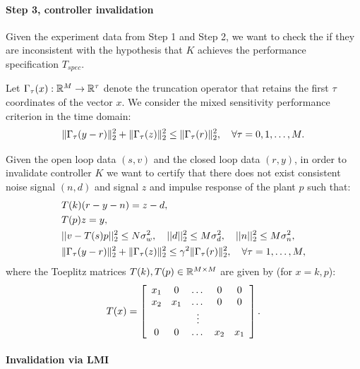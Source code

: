 \documentclass[11pt, onecolumn]{article}
\theoremstyle{plain}
\theoremstyle{plain}
\theoremstyle{definition}
\begin{document}
\paragraph{Step 3, controller invalidation}
Given the experiment data from Step 1 and Step 2, we want to check the if they are inconsistent with
the hypothesis that $K$ achieves the performance specification $T_{spec}$.

Let $\Gamma_{\tau}(x):\mathbb R^{M}\to \mathbb R^{\tau}$ denote the truncation operator that retains the first $\tau$
coordinates of the vector $x$. We consider the mixed sensitivity performance criterion in the time
domain:
\begin{align*}
  \|\Gamma_{\tau}(y-r)\|_2^2 + \|\Gamma_{\tau}(z)\|_2^2 \le \|\Gamma_{\tau}(r)\|_2^2, \quad \forall \tau = 0,1,\dots, M.
\end{align*}

Given the open loop data $(s,v)$ and the closed loop data $(r,y)$, in order to  invalidate controller
$K$ we want to certify that there does not exist consistent noise signal $(n,d)$ and signal $z$ and
impulse response of the plant $p$ such that:
\begin{align}
  & T(k) (r-y - n) = z-d,
  \label{eq:linear-k}
  \\
  & T(p) z = y,
  \label{eq:quad-p}
  \\
  & ||v - T(s)p||_2^2 \le N \sigma_w^2, \quad ||d||_2^2\leq M \sigma_d^2 , \quad ||n||_2^2\leq M
  \sigma_n^2,
  \label{eq:noise-bound}
  \\
  & \|\Gamma_{\tau}(y-r)\|_2^2 + \|\Gamma_{\tau}(z)\|_2^2 \le \gamma^2 \|\Gamma_{\tau}(r)\|_2^2, \quad \forall
  \tau = 1,\dots, M,
  \label{eq:perf-spec}
\end{align}
where the Toeplitz matrices $T(k), T(p)\in\mathbb R^{M\times M}$  are given by (for $x=k,p$):
\begin{align}
  \label{eq:Tk-Tp}
  T(x) = \left[
    \begin{array}[c]{ccccc}
      x_1 & 0 &\dots & 0  & 0
      \\
      x_2 & x_1 & \dots  & 0  & 0
      \\
      & & \vdots & &
      \\
      0  & 0  & \dots & x_2 & x_1
    \end{array}
\right].
\end{align}


\paragraph{Invalidation via LMI}
\end{document}
